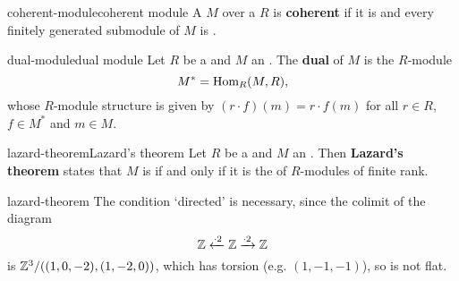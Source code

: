 \begin{topic}{coherent-module}{coherent module}
    A  $M$ over a  $R$ is \textbf{coherent} if it is  and every finitely generated submodule of $M$ is .
\end{topic}

\begin{topic}{dual-module}{dual module}
    Let $R$ be a  and $M$ an . The \textbf{dual} of $M$ is the $R$-module
    \[ M^* = \text{Hom}_R(M, R) , \]
    whose $R$-module structure is given by $(r \cdot f)(m) = r \cdot f(m)$ for all $r \in R$, $f \in M^*$ and $m \in M$.
\end{topic}

\begin{topic}{lazard-theorem}{Lazard's theorem}
    Let $R$ be a  and $M$ an . Then \textbf{Lazard's theorem} states that $M$ is  if and only if it is the  of  $R$-modules of finite rank.
\end{topic}

\begin{example}{lazard-theorem}
    The condition `directed' is necessary, since the colimit of the diagram
    \[ \mathbb{Z} \xleftarrow{\cdot 2} \mathbb{Z} \xrightarrow{\cdot 2} \mathbb{Z} \]
    is $\mathbb{Z}^3 / ((1, 0, -2), (1, -2, 0))$, which has torsion (e.g. $(1, -1, -1)$), so is not flat.
\end{example}
